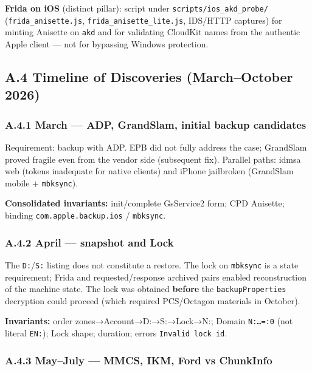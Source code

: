\documentclass[
  english,
  10pt]{article}
\begin{document}
\textbf{Frida on iOS} (distinct pillar): script under
\texttt{scripts/ios\_akd\_probe/} (\texttt{frida\_anisette.js},
\texttt{frida\_anisette\_lite.js}, IDS/HTTP captures) for minting
Anisette on \texttt{akd} and for validating CloudKit names from the
authentic Apple client --- not for bypassing Windows protection.

\subsection{A.4 Timeline of Discoveries (March--October
2026)}\label{a.4-timeline-of-discoveries-marchoctober-2026}

\subsubsection{A.4.1 March --- ADP, GrandSlam, initial backup
candidates}\label{a.4.1-march-adp-grandslam-initial-backup-candidates}

Requirement: backup with ADP. EPB did not fully address the case;
GrandSlam proved fragile even from the vendor side (subsequent fix).
Parallel paths: idmsa web (tokens inadequate for native clients) and
iPhone jailbroken (GrandSlam mobile + \texttt{mbksync}).

\textbf{Consolidated invariants:} init/complete GsService2 form; CPD
Anisette; binding \texttt{com.apple.backup.ios} / \texttt{mbksync}.

\subsubsection{A.4.2 April --- snapshot and
Lock}\label{a.4.2-april-snapshot-and-lock}

The \texttt{D:}/\texttt{S:} listing does not constitute a restore. The
lock on \texttt{mbksync} is a state requirement; Frida and
requested/response archived pairs enabled reconstruction of the machine
state. The lock was obtained \textbf{before} the
\texttt{backupProperties} decryption could proceed (which required
PCS/Octagon materials in October).

\textbf{Invariants:} order zones→Account→D:→S:→Lock→N:; Domain
\texttt{N:…=:0} (not literal \texttt{EN:}); Lock shape; duration; errors
\texttt{Invalid\ lock\ id}.

\subsubsection{A.4.3 May--July --- MMCS, IKM, Ford vs
ChunkInfo}\label{a.4.3-mayjuly-mmcs-ikm-ford-vs-chunkinfo}
\end{document}

